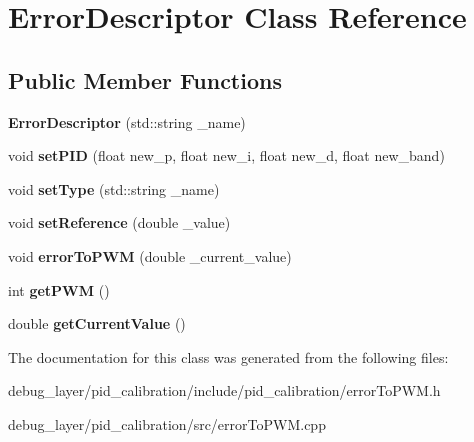\hypertarget{classErrorDescriptor}{}\section{Error\+Descriptor Class Reference}
\label{classErrorDescriptor}
\subsection*{Public Member Functions}
\begin{DoxyCompactItemize}
\item 
\mbox{\label{classErrorDescriptor_aa6873020ab6b06ed818163e21b32153d}} 
{\bfseries Error\+Descriptor} (std\+::string \+\_\+name)
\item 
\mbox{\label{classErrorDescriptor_afc783570c3d68c62484d3d497c63611b}} 
void {\bfseries set\+P\+ID} (float new\+\_\+p, float new\+\_\+i, float new\+\_\+d, float new\+\_\+band)
\item 
\mbox{\label{classErrorDescriptor_a7843bd233c7fadd26654a42c8c447911}} 
void {\bfseries set\+Type} (std\+::string \+\_\+name)
\item 
\mbox{\label{classErrorDescriptor_ab4bf6a37278e571abc09da8327625fd3}} 
void {\bfseries set\+Reference} (double \+\_\+value)
\item 
\mbox{\label{classErrorDescriptor_ac461f29a6baa8cbfda296d39e12fafb3}} 
void {\bfseries error\+To\+P\+WM} (double \+\_\+current\+\_\+value)
\item 
\mbox{\label{classErrorDescriptor_a0092487859383d38d70a2cf4c67cb42f}} 
int {\bfseries get\+P\+WM} ()
\item 
\mbox{\label{classErrorDescriptor_aae79d462e543e29c61b5267558f4bdc4}} 
double {\bfseries get\+Current\+Value} ()
\end{DoxyCompactItemize}


The documentation for this class was generated from the following files\+:\begin{DoxyCompactItemize}
\item 
debug\+\_\+layer/pid\+\_\+calibration/include/pid\+\_\+calibration/error\+To\+P\+W\+M.\+h\item 
debug\+\_\+layer/pid\+\_\+calibration/src/error\+To\+P\+W\+M.\+cpp\end{DoxyCompactItemize}
